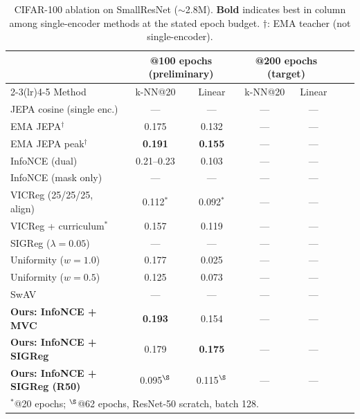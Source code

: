 \begin{table}[t]
  \centering
  \caption{CIFAR-100 ablation on SmallResNet ($\sim$2.8M).
  \textbf{Bold} indicates best in column among single-encoder methods at the
  stated epoch budget.
  $\dagger$: EMA teacher (not single-encoder).}
  \label{tab:ablation-200}
  \begin{tabular}{lcccccc}
    \toprule
    & \multicolumn{2}{c}{@100 epochs (preliminary)}
    & \multicolumn{2}{c}{@200 epochs (target)} \\
    \cmidrule(lr){2-3}\cmidrule(lr){4-5}
    Method & k-NN@20 & Linear & k-NN@20 & Linear \\
    \midrule
    JEPA cosine (single enc.)        & --- & --- & --- & --- \\
    EMA JEPA$^\dagger$              & 0.175 & 0.132 & --- & --- \\
    EMA JEPA peak$^\dagger$         & \textbf{0.191} & \textbf{0.155} & --- & --- \\
    \midrule
    InfoNCE (dual)                  & 0.21--0.23 & 0.103 & --- & --- \\
    InfoNCE (mask only)             & --- & --- & --- & --- \\
    VICReg (25/25/25, align)        & 0.112$^*$ & 0.092$^*$ & --- & --- \\
    VICReg + curriculum$^*$         & 0.157 & 0.119 & --- & --- \\
    SIGReg ($\lambda{=}0.05$)       & --- & --- & --- & --- \\
    Uniformity ($w{=}1.0$)          & 0.177 & 0.025 & --- & --- \\
    Uniformity ($w{=}0.5$)          & 0.125 & 0.073 & --- & --- \\
    SwAV                            & --- & --- & --- & --- \\
    \midrule
    \textbf{Ours: InfoNCE + MVC}    & \textbf{0.193} & 0.154 & --- & --- \\
    \textbf{Ours: InfoNCE + SIGReg} & 0.179 & \textbf{0.175} & --- & --- \\
    \textbf{Ours: InfoNCE + SIGReg (R50)} & 0.095$^\S$ & 0.115$^\S$ & --- & --- \\
    \bottomrule
  \multicolumn{5}{l}{\footnotesize $^*$@20 epochs; $^\S$@62 epochs, ResNet-50 scratch, batch 128.}
  \end{tabular}
\end{table}

